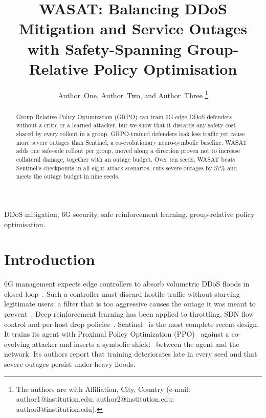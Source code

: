 \documentclass[journal]{IEEEtran}
\begin{document}
\title{WASAT: Balancing DDoS Mitigation and Service Outages with Safety-Spanning Group-Relative Policy Optimisation}

\author{Author~One, Author~Two, and Author~Three%
\thanks{The authors are with Affiliation, City, Country (e-mail: author1@institution.edu; author2@institution.edu; author3@institution.edu).}}


\maketitle

\begin{abstract}
Group Relative Policy Optimization (GRPO) can train 6G edge DDoS defenders without a critic or a learned attacker, but we show that it discards any safety cost shared by every rollout in a group. GRPO-trained defenders leak less traffic yet cause more severe outages than Sentinel, a co-evolutionary neuro-symbolic baseline. WASAT adds one safe-side rollout per group, moved along a direction proven not to increase collateral damage, together with an outage budget. Over ten seeds, WASAT beats Sentinel's checkpoints in all eight attack scenarios, cuts severe outages by 57\% and meets the outage budget in nine seeds.
\end{abstract}

\begin{IEEEkeywords}
DDoS mitigation, 6G security, safe reinforcement learning, group-relative policy optimisation.
\end{IEEEkeywords}

\section{Introduction}
 6G management expects edge controllers to absorb volumetric DDoS floods in closed loop~\cite{benzaid2020zsm,liyanage2023oran}. Such a controller must discard hostile traffic without starving legitimate users: a filter that is too aggressive causes the outage it was meant to prevent~\cite{guo2020xai6g}. Deep reinforcement learning has been applied to throttling, SDN flow control and per-host drop policies~\cite{malialis2015distributed,liu2018drlddos,simpson2020perhost}. Sentinel~\cite{alfatemi2026sentinel} is the most complete recent design. It trains its agent with Proximal Policy Optimization (PPO)~\cite{schulman2017ppo} against a co-evolving attacker and inserts a symbolic shield~\cite{alshiekh2018shielding} between the agent and the network. Its authors report that training deteriorates late in every seed and that severe outages persist under heavy floods.
\end{document}

